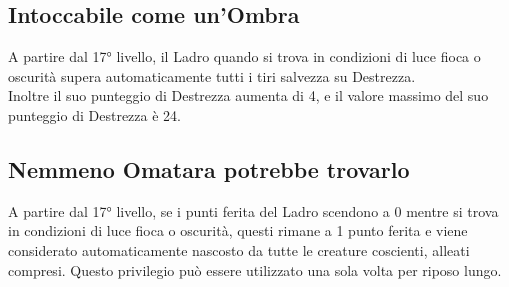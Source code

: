 \subsection{Intoccabile come un'Ombra}

A partire dal 17° livello, il Ladro quando si trova in condizioni di luce fioca o oscurità supera automaticamente tutti i tiri salvezza su Destrezza. \\ Inoltre il suo punteggio di Destrezza aumenta di 4, e il valore massimo del suo punteggio di Destrezza è 24.

\subsection{Nemmeno Omatara potrebbe trovarlo}

A partire dal 17° livello, se i punti ferita del Ladro scendono a 0 mentre si trova in condizioni di luce fioca o oscurità, questi rimane a 1 punto ferita e viene considerato automaticamente nascosto da tutte le creature coscienti, alleati compresi. Questo privilegio può essere utilizzato una sola volta per riposo lungo.